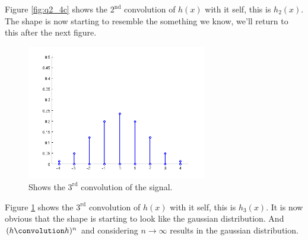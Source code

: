 \documentclass[a4paper, 10pt, final]{article}
\begin{document}
Figure \ref{fig:q2_4c} shows the $2^{\textrm{nd}}$ convolution of
$h(x)$ with it self, this is $h_2(x)$. The shape is now starting to
resemble the something we know, we'll return to this after the next
figure.

\begin{figure}[H]
  \centering
  \includegraphics[width=0.7\textwidth]{./images/q2_4d}
  \caption{Shows the $3^{\textrm{rd}}$ convolution of the signal.}
    \label{fig:q2_4d}
\end{figure}

Figure \ref{fig:q2_4d} shows the $3^{\textrm{rd}}$ convolution of
$h(x)$ with it self, this is $h_3(x)$. It is now obvious that the
shape is starting to look like the gaussian distribution. And $(h
\convolution h)^n$ and considering $n \rightarrow \infty$ results in
the gaussian distribution.


%
%
\end{document}
